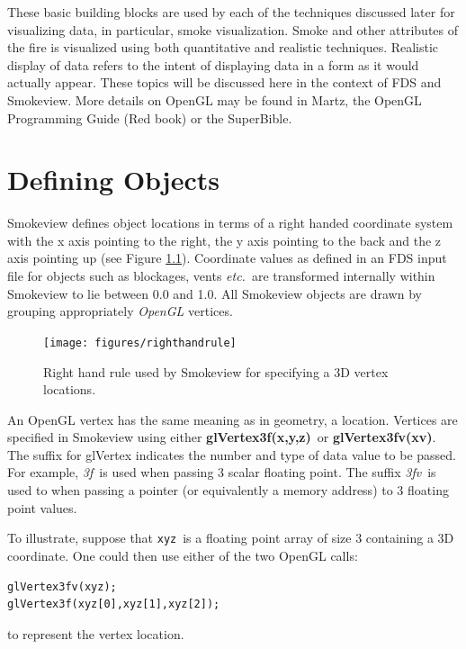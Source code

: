 \documentclass[11pt,twoside]{book}
\newcommand{\figoptions}{htp}
\begin{document}
These basic building blocks are used by each of the techniques discussed later for visualizing data, in particular, smoke visualization.  Smoke and other attributes of the fire is visualized using both quantitative and realistic techniques.  Realistic display of data refers to the intent of displaying data in a form as it would actually appear.
These topics will be discussed here in the context of FDS and Smokeview.
More details on OpenGL may be found in Martz\cite{martz:06},
the OpenGL Programming Guide (Red book)\cite{OpenGLRed} or the SuperBible\cite{SUPERBIBLE}.

%
%

\chapter{Defining Objects} Smokeview defines object locations in terms of a right handed coordinate system with the x axis pointing to the right, the y axis pointing to the back and the z axis pointing up (see Figure \ref{figrighthand}).  Coordinate values as defined in an FDS input file for objects such as blockages, vents {\em etc.}\ are transformed internally within Smokeview to lie between 0.0 and 1.0.
All Smokeview objects are drawn by grouping appropriately {\em OpenGL} vertices.
\begin{figure}[\figoptions]
\begin{center}
\texttt{[image: figures/righthandrule]}
\end{center}
\caption{Right hand rule used by Smokeview for specifying a 3D vertex locations.}
\label{figrighthand}
\end{figure}

An OpenGL vertex has the same meaning as in geometry, a location.
Vertices are specified in Smokeview using either {\bf glVertex3f(x,y,z)}\ or {\bf glVertex3fv(xv)}.  The suffix for glVertex indicates the number and type of data value to be passed.  For example, {\em 3f}\ is used when passing 3 scalar floating point.  The suffix {\em 3fv}\ is used to when passing a pointer (or equivalently a memory address) to 3 floating point  values.

To illustrate, suppose that {\tt xyz}\ is a floating point array of size 3 containing a 3D coordinate.  One could then use either of the two OpenGL calls:
\begin{verbatim}
glVertex3fv(xyz);
glVertex3f(xyz[0],xyz[1],xyz[2]);
\end{verbatim}
to represent the vertex location.
\end{document}
